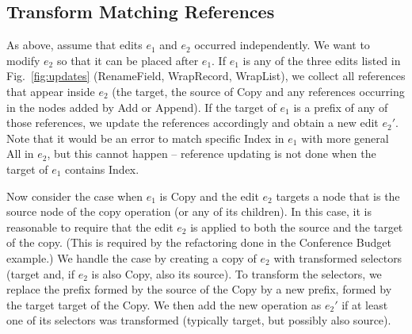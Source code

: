 \documentclass[sigconf,anonymous,screen]{acmart}
\newcommand{\ident}[1]{{\sffamily #1}}
\begin{document}
\subsection{Transform Matching References}
\label{app:merge-transform-refs}

As above, assume that edits $e_1$ and $e_2$ occurred independently. We want to
modify $e_2$ so that it can be placed after $e_1$. If $e_1$ is any of the three edits
listed in Fig.~\ref{fig:updates} (\ident{RenameField}, \ident{WrapRecord}, \ident{WrapList}),
we collect all references that appear inside $e_2$ (the target, the source of \ident{Copy}
and any references occurring in the nodes added by \ident{Add} or \ident{Append}).
If the target of $e_1$ is a prefix of any of those references, we update the references
accordingly and obtain a new edit $e_2'$. Note that it would be an error to match specific
\ident{Index} in $e_1$ with more general \ident{All} in $e_2$, but this cannot happen --
reference updating is not done when the target of $e_1$ contains \ident{Index}.

Now consider the case when $e_1$ is \ident{Copy} and the edit $e_2$ targets a node that is
the source node of the copy operation (or any of its children). In this case, it is reasonable
to require that the edit $e_2$ is applied to both the source and the target of the copy.
(This is required by the refactoring done in the Conference Budget example.)
We handle the case by creating a copy of $e_2$ with transformed selectors (target and, if $e_2$
is also \ident{Copy}, also its source). To transform the selectors, we replace the prefix
formed by the source of the \ident{Copy} by a new prefix, formed by the target target of
the \ident{Copy}. We then add the new operation as $e_2'$ if at least one of its selectors
was transformed (typically target, but possibly also source).
\end{document}
